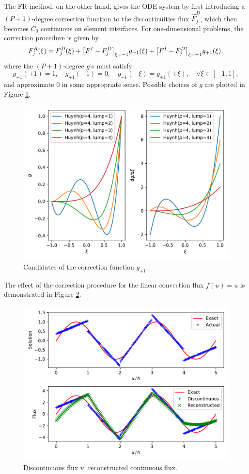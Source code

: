 \documentclass[10pt]{article}
\begin{document}
%
The FR method, on the other hand, gives the ODE system by first introducing a $(P+1)$-degree correction function to the discontinuities flux $\vec{F}_j^{D}$, which then becomes $C_0$ continuous on element interfaces.
%
For one-dimensional problems, the correction procedure is given by
$$
F_j^{R}(\xi)=F_j^{D}(\xi) + \qty[F^{I}-F_j^{D}]_{\xi=-1} g_{-1}(\xi) + \qty[F^{I}-F_j^{D}]_{\xi=+1} g_{+1}(\xi),
$$
where the $(P+1)$-degree $g$'s must satisfy
$$
g_{+1}(+1)=1,\quad
g_{+1}(-1)=0,\quad
g_{-1}(-\xi)=g_{+1}(+\xi),\quad \forall\xi\in[-1,1],
$$
and approximate $0$ in some appropriate sense.
Possible choices of $g$ are plotted in Figure \ref{fr:lumping}.
%
\begin{figure}[H]
  \centering
  \includegraphics[width=.8\textwidth]{./fr/HuynhLumping.pdf}
  \caption{Candidates of the correction function $g_{+1}$.}
  \label{fr:lumping}
\end{figure}
%
The effect of the correction procedure for the linear convection flux $f(u)=u$ is demonstrated in Figure \ref{fr:compare}.
\begin{figure}[H]
  \centering
  \includegraphics[width=.8\textwidth]{./fr/FRonLegendreRoots.pdf}
  \caption{Discontinuous flux v. reconstructed continuous flux.}
  \label{fr:compare}
\end{figure}
\end{document}
